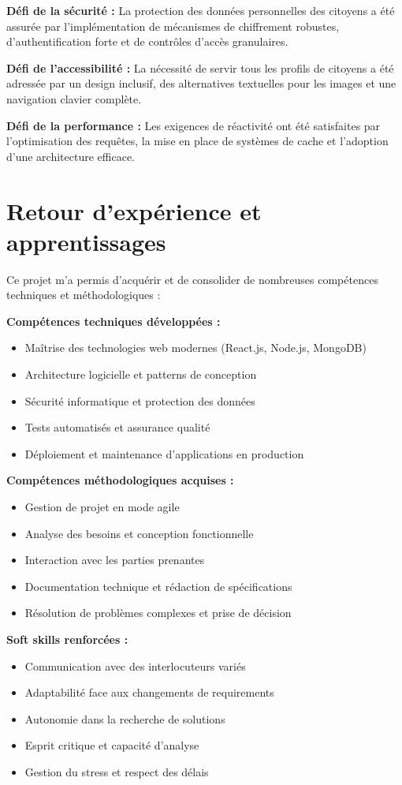 \textbf{Défi de la sécurité :} La protection des données personnelles des citoyens a été assurée par l'implémentation de mécanismes de chiffrement robustes, d'authentification forte et de contrôles d'accès granulaires.

\textbf{Défi de l'accessibilité :} La nécessité de servir tous les profils de citoyens a été adressée par un design inclusif, des alternatives textuelles pour les images et une navigation clavier complète.

\textbf{Défi de la performance :} Les exigences de réactivité ont été satisfaites par l'optimisation des requêtes, la mise en place de systèmes de cache et l'adoption d'une architecture efficace.

\section*{Retour d'expérience et apprentissages}

Ce projet m'a permis d'acquérir et de consolider de nombreuses compétences techniques et méthodologiques :

\textbf{Compétences techniques développées :}
\begin{itemize}
\item Maîtrise des technologies web modernes (React.js, Node.js, MongoDB)
\item Architecture logicielle et patterns de conception
\item Sécurité informatique et protection des données
\item Tests automatisés et assurance qualité
\item Déploiement et maintenance d'applications en production
\end{itemize}

\textbf{Compétences méthodologiques acquises :}
\begin{itemize}
\item Gestion de projet en mode agile
\item Analyse des besoins et conception fonctionnelle
\item Interaction avec les parties prenantes
\item Documentation technique et rédaction de spécifications
\item Résolution de problèmes complexes et prise de décision
\end{itemize}

\textbf{Soft skills renforcées :}
\begin{itemize}
\item Communication avec des interlocuteurs variés
\item Adaptabilité face aux changements de requirements
\item Autonomie dans la recherche de solutions
\item Esprit critique et capacité d'analyse
\item Gestion du stress et respect des délais
\end{itemize}

